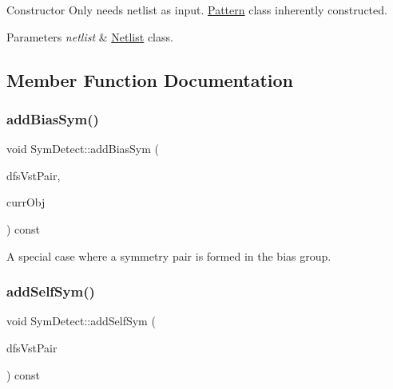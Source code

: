 Constructor Only needs netlist as input. \hyperlink{classPattern}{Pattern} class inherently constructed. 


\begin{DoxyParams}{Parameters}
{\em netlist} & \hyperlink{classNetlist}{Netlist} class. \\
\hline
\end{DoxyParams}


\subsection{Member Function Documentation}
\mbox{\label{classSymDetect_a79b9b8042087a413df53daf4e5600728}} 
\subsubsection{\texorpdfstring{add\+Bias\+Sym()}{addBiasSym()}}
{\footnotesize\ttfamily void Sym\+Detect\+::add\+Bias\+Sym (\begin{DoxyParamCaption}\item[{std\+::vector$<$ \hyperlink{classMosPair}{Mos\+Pair} $>$ \&}]{dfs\+Vst\+Pair,  }\item[{\hyperlink{classMosPair}{Mos\+Pair} \&}]{curr\+Obj }\end{DoxyParamCaption}) const\hspace{0.3cm}{\ttfamily [private]}}



A special case where a symmetry pair is formed in the bias group. 

\mbox{\label{classSymDetect_ac3075fde17fa6c33093a683b18f17086}} 
\subsubsection{\texorpdfstring{add\+Self\+Sym()}{addSelfSym()}}
{\footnotesize\ttfamily void Sym\+Detect\+::add\+Self\+Sym (\begin{DoxyParamCaption}\item[{std\+::vector$<$ \hyperlink{classMosPair}{Mos\+Pair} $>$ \&}]{dfs\+Vst\+Pair }\end{DoxyParamCaption}) const\hspace{0.3cm}{\ttfamily [private]}}



